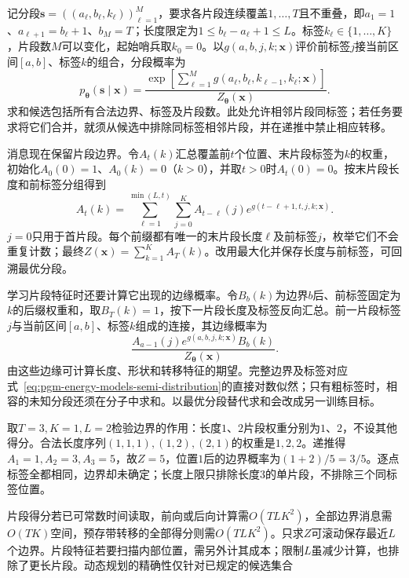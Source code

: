 记分段$\bm{s}=((a_\ell,b_\ell,k_\ell))_{\ell=1}^M$，要求各片段连续覆盖$1,\ldots,T$且不重叠，即$a_1=1$、$a_{\ell+1}=b_\ell+1$、$b_M=T$；长度限定为$1\leq b_\ell-a_\ell+1\leq L$。标签$k_\ell\in\{1,\ldots,K\}$，片段数$M$可以变化，起始哨兵取$k_0=0$。以$g(a,b,j,k;\bm{x})$评价前标签$j$接当前区间$[a,b]$、标签$k$的组合，分段概率为
\begin{equation}
  p_{\bm{\theta}}(\bm{s}\mid\bm{x})
   =\frac{\exp\!\left[
        \sum_{\ell=1}^M
          g(a_\ell,b_\ell,k_{\ell-1},k_\ell;\bm{x})
                    \right]}
          {Z_{\bm{\theta}}(\bm{x})}.
  \label{eq:pgm-energy-models-semi-distribution}
\end{equation}
求和候选包括所有合法边界、标签及片段数。此处允许相邻片段同标签；若任务要求将它们合并，就须从候选中排除同标签相邻片段，并在递推中禁止相应转移。

消息现在保留片段边界。令$A_t(k)$汇总覆盖前$t$个位置、末片段标签为$k$的权重，初始化$A_0(0)=1$、$A_0(k)=0$（$k>0$），并取$t>0$时$A_t(0)=0$。按末片段长度和前标签分组得到
\begin{equation}
  A_t(k)=
    \sum_{\ell=1}^{\min(L,t)}\sum_{j=0}^K
       A_{t-\ell}(j)
       e^{g(t-\ell+1,t,j,k;\bm{x})}.
  \label{eq:pgm-energy-models-semi-forward}
\end{equation}
$j=0$只用于首片段。每个前缀都有唯一的末片段长度$\ell$及前标签$j$，枚举它们不会重复计数；最终$Z(\bm{x})=\sum_{k=1}^KA_T(k)$。改用最大化并保存长度与前标签，可回溯最优分段。

学习片段特征时还要计算它出现的边缘概率。令$B_b(k)$为边界$b$后、前标签固定为$k$的后缀权重和，取$B_T(k)=1$，按下一片段长度及标签反向汇总。前一片段标签$j$与当前区间$[a,b]$、标签$k$组成的连接，其边缘概率为
\[
  \frac{A_{a-1}(j)
           e^{g(a,b,j,k;\bm{x})}B_b(k)}
       {Z_{\bm{\theta}}(\bm{x})}.
\]
由这些边缘可计算长度、形状和转移特征的期望。完整边界及标签对应式~\eqref{eq:pgm-energy-models-semi-distribution}的直接对数似然；只有粗标签时，相容的未知分段还须在分子中求和。以最优分段替代求和会改成另一训练目标。

取$T=3,K=1,L=2$检验边界的作用：长度$1$、$2$片段权重分别为$1$、$2$，不设其他得分。合法长度序列$(1,1,1),(1,2),(2,1)$的权重是$1,2,2$。递推得$A_1=1,A_2=3,A_3=5$，故$Z=5$，位置$1$后的边界概率为$(1+2)/5=3/5$。逐点标签全都相同，边界却未确定；长度上限只排除长度$3$的单片段，不排除三个同标签位置。

片段得分若已可常数时间读取，前向或后向计算需$O(TLK^2)$，全部边界消息需$O(TK)$空间，预存带转移的全部得分则需$O(TLK^2)$。只求$Z$可滚动保存最近$L$个边界。片段特征若要扫描内部位置，需另外计其成本；限制$L$虽减少计算，也排除了更长片段。动态规划的精确性仅针对已规定的候选集合

